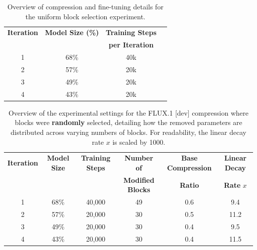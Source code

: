 \begin{table}[h]
	\centering
	\caption[Uniform Block Selection: Compression Details]{Overview of compression and fine-tuning details for the uniform block selection experiment.}
	\label{tab:Random_vs_metric_Selection}
	\begin{tabular}{c c  c c}
		\toprule
		\textbf{Iteration} & \textbf{Model Size (\%)} & \textbf{Training Steps} \\
	&& \textbf{per Iteration} \\
		\midrule
		1 & 68\%    & 40k \\ %
		2 & 57\%   & 20k \\
		3 & 49\%   & 20k \\
		4 & 43\%  & 20k \\
		\bottomrule
	\end{tabular}
\end{table}



\begin{table}[H]
	\centering
	\caption[Random Block Selection: Compression Details]{Overview of the experimental settings for the FLUX.1 [dev] compression where blocks were \textbf{randomly} selected, detailing how the removed parameters are distributed across varying numbers of blocks. For readability, the linear decay rate $x$ is scaled by 1000.}
	\label{tab:RandomBlockSelectionDetails}
	\begin{tabular}{cccccc}
		\toprule
		\textbf{Iteration} &\textbf{Model Size} & \textbf{Training Steps} & \textbf{Number of} & \textbf{Base Compression} & \textbf{Linear Decay}\\
		&&&\textbf{Modified Blocks}&\textbf{Ratio}& \textbf{Rate} $x$\\
		\midrule
		
		1 &  68\%&  40,000 & 49 & 0.6 & 9.4 \\
		
	
		
		
		2 & 57\% & 20,000 &  30 & 0.5 & 11.2 \\
		

		
		3 & 49\% & 20,000 &  30 & 0.4  & 9.5 \\
		
	
		
		4& 43\% &  20,000 & 30 & 0.4  & 11.5 \\
		
		
		
		\bottomrule
	\end{tabular}
\end{table}


